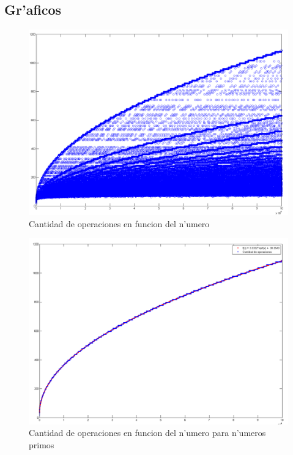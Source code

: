\subsection{Gr'aficos}
\begin{figure}[H]
\centering
\includegraphics[scale=0.5]{../../codigo/ejercicio1/benchmark/graficos/todos_los_numeros/graficosTodos.png}
\caption{Cantidad de operaciones en funcion del n'umero}
\end{figure}

\begin{figure}[H]
\centering
\includegraphics[scale=0.5]{../../codigo/ejercicio1/benchmark/graficos/primos/graficoPrimos.png}
\caption{Cantidad de operaciones en funcion del n'umero para n'umeros primos}
\end{figure}

